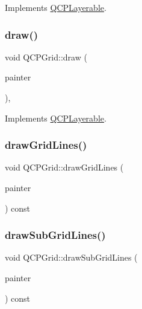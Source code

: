 Implements \mbox{\hyperlink{class_q_c_p_layerable_afdf83ddc6a265cbf4c89fe99d3d93473}{Q\+C\+P\+Layerable}}.

\mbox{\label{class_q_c_p_grid_aad9a312d998e2d170956334d4cb80be2}} 
\subsubsection{\texorpdfstring{draw()}{draw()}}
{\footnotesize\ttfamily void Q\+C\+P\+Grid\+::draw (\begin{DoxyParamCaption}\item[{\mbox{\hyperlink{class_q_c_p_painter}{Q\+C\+P\+Painter}} $\ast$}]{painter }\end{DoxyParamCaption})\hspace{0.3cm}{\ttfamily [protected]}, {\ttfamily [virtual]}}



Implements \mbox{\hyperlink{class_q_c_p_layerable_aecf2f7087482d4b6a78cb2770e5ed12d}{Q\+C\+P\+Layerable}}.

\mbox{\label{class_q_c_p_grid_aee4e95d54acabbe298d6dda0dd86c0a4}} 
\subsubsection{\texorpdfstring{drawGridLines()}{drawGridLines()}}
{\footnotesize\ttfamily void Q\+C\+P\+Grid\+::draw\+Grid\+Lines (\begin{DoxyParamCaption}\item[{\mbox{\hyperlink{class_q_c_p_painter}{Q\+C\+P\+Painter}} $\ast$}]{painter }\end{DoxyParamCaption}) const\hspace{0.3cm}{\ttfamily [protected]}}

\mbox{\label{class_q_c_p_grid_a751ce8aef815bcc9193432a30c8b6b6e}} 
\subsubsection{\texorpdfstring{drawSubGridLines()}{drawSubGridLines()}}
{\footnotesize\ttfamily void Q\+C\+P\+Grid\+::draw\+Sub\+Grid\+Lines (\begin{DoxyParamCaption}\item[{\mbox{\hyperlink{class_q_c_p_painter}{Q\+C\+P\+Painter}} $\ast$}]{painter }\end{DoxyParamCaption}) const\hspace{0.3cm}{\ttfamily [protected]}}

